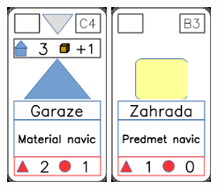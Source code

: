 \documentclass[a4paper]{article}
\begin{document}
	\includegraphics[width=3.0cm]{img-3_13}
	\includegraphics[width=3.0cm]{img-2_22}
\end{document}
